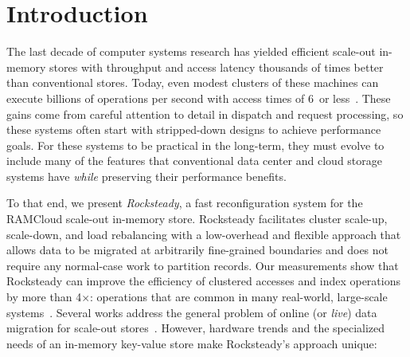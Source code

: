 \section{Introduction}
\label{ref:intro}

The last decade of computer systems research has yielded efficient scale-out
in-memory stores with throughput and access latency thousands of times better
than conventional stores. Today, even modest clusters of these machines can
execute billions of operations per second with access times of 6~\us or
less~\cite{ramcloud,farm-2014}.  These gains come from careful attention to detail
in dispatch and request processing, so these systems often start with
stripped-down designs to achieve performance goals. For these
systems to be practical in the long-term, they must evolve to include many of the
features that conventional data center and cloud storage systems have
{\em while} preserving their performance benefits.

To that end, we present {\em Rocksteady}, a fast reconfiguration
system for the RAMCloud scale-out in-memory store. Rocksteady
facilitates cluster
scale-up, scale-down, and load rebalancing with a low-overhead and flexible
approach that allows data to be migrated at arbitrarily fine-grained boundaries and does not
require any normal-case work to partition records.  Our measurements show that
Rocksteady can improve the efficiency of clustered accesses and index
operations by more than 4$\times$: operations that are common in many
real-world, large-scale systems~\cite{fb-memcache,spanner}.  Several works
address the general problem of online (or {\em live}) data migration for
scale-out
stores~\cite{slacker,estore,squall,albatross,zephyr,dynamo,spanner}.
However, hardware trends and the specialized needs of an in-memory
key-value store
make Rocksteady's approach unique:

